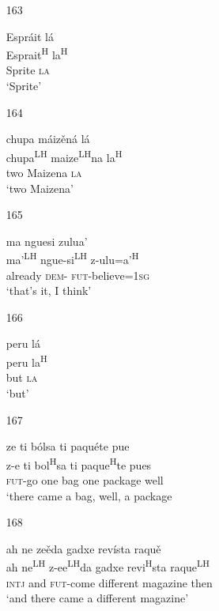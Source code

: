 \begin{itemize}
\item[163]
 
\glll   Espr\'{a}it l\'{a}\\
 Esprait\textsuperscript{H} la\textsuperscript{H}\\
Sprite \textsc{la}\\
\glt `Sprite'
 


\item[164]
 
\glll   chupa m\'{a}iz\v{e}n\'{a} l\'{a}\\
chupa\textsuperscript{LH} maize\textsuperscript{LH}na la\textsuperscript{H}\\
two Maizena \textsc{la}\\
\glt `two Maizena'
 


\item[165]
 
\glll   ma nguesi zulua'\\
 ma'\textsuperscript{LH} ngue-si\textsuperscript{LH}  z-ulu=a'\textsuperscript{H}\\
already \textsc{dem}- \textsc{fut}-believe=\textsc{1sg}\\
\glt `that's it, I think'
 


\item[166]
 
\glll   peru l\'{a}\\
peru la\textsuperscript{H}\\
but \textsc{la}\\
\glt `but'
 


\item[167]
 
\glll  ze ti b\'{o}lsa ti paqu\'{e}te pue\\
z-e ti bol\textsuperscript{H}sa ti paque\textsuperscript{H}te pues\\
\textsc{fut}-go one bag one package well \\
\glt `there came a bag, well, a package
 



\item[168]
 
\glll   ah ne ze\v{e}da gadxe rev\'{i}sta raqu\v{e} \\
ah ne\textsuperscript{LH} z-ee\textsuperscript{LH}da gadxe revi\textsuperscript{H}sta raque\textsuperscript{LH}\\
\textsc{intj} and \textsc{fut}-come different magazine then\\
\glt `and there came a different magazine'
 



\end{itemize}

